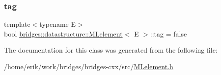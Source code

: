 \subsubsection{\texorpdfstring{tag}{tag}}
{\footnotesize\ttfamily template$<$typename E$>$ \\
bool \hyperlink{classbridges_1_1datastructure_1_1_m_lelement}{bridges\+::datastructure\+::\+M\+Lelement}$<$ E $>$\+::tag = false\hspace{0.3cm}{\ttfamily [protected]}}



The documentation for this class was generated from the following file\+:\begin{DoxyCompactItemize}
\item 
/home/erik/work/bridges/bridges-\/cxx/src/\hyperlink{_m_lelement_8h}{M\+Lelement.\+h}\end{DoxyCompactItemize}
